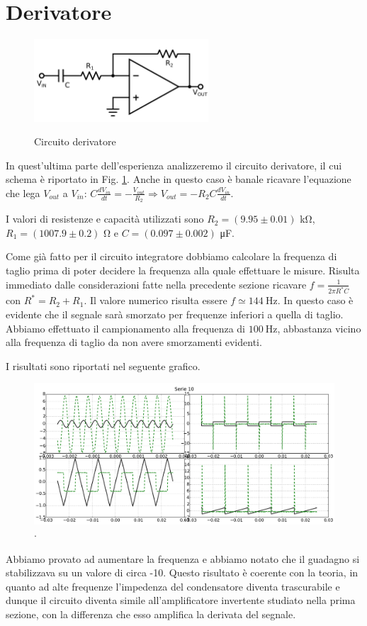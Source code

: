 \section{Derivatore}

\begin{figure}
	\caption{Circuito derivatore}
	\includegraphics[width=65mm]{ccder.pdf}
	\label{fig:ccder}
\end{figure}

In quest'ultima parte dell'esperienza analizzeremo il circuito derivatore, il cui schema è riportato in Fig. \ref{fig:ccder}.
Anche in questo caso è banale ricavare l'equazione che lega $V_{out}$ a $V_{in}$: $C\frac{dV_{in}}{dt}=-\frac{V_{out}}{R_2}\Rightarrow V_{out}=-R_2C\frac{dV_{in}}{dt}$.

I valori di resistenze e capacità utilizzati sono $R_2=(9.95 \pm 0.01)$ \si{\kilo\ohm}, $R_1=(1007.9 \pm 0.2)$ \si{\ohm} e $C=(0.097 \pm 0.002)$ \si{\micro\farad}.

Come già fatto per il circuito integratore dobbiamo calcolare la frequenza di taglio prima di poter decidere la frequenza alla quale effettuare le misure.
Risulta immediato dalle considerazioni fatte nella precedente sezione ricavare $f=\frac{1}{2 \pi R^* C}$ con $R^*=R_2+R_1$.
Il valore numerico risulta essere $f \simeq \SI{144}{\hertz}$.
In questo caso è evidente che il segnale sarà smorzato per frequenze inferiori a quella di taglio. Abbiamo effettuato il campionamento alla frequenza di $\SI{100}{\hertz}$, abbastanza vicino alla frequenza di taglio da non avere smorzamenti evidenti.

I risultati sono riportati nel seguente grafico.

\begin{figure}[h]
	\centering
			\includegraphics[width=.9\textwidth]{der_serie_10.pdf}
			\caption{$\cdot$}
			\label{fig:der}
\end{figure}

Abbiamo provato ad aumentare la frequenza e abbiamo notato che il guadagno si stabilizzava su un valore di circa -10.
Questo risultato è coerente con la teoria, in quanto ad alte frequenze l'impedenza del condensatore diventa trascurabile e dunque il circuito diventa simile all'amplificatore invertente studiato nella prima sezione, con la differenza che esso amplifica la derivata del segnale.